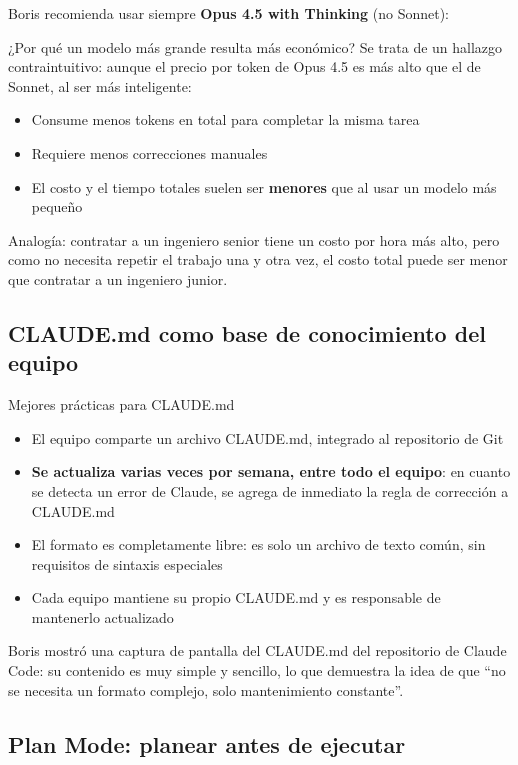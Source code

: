 \documentclass[a4paper]{article}
\begin{document}
Boris recomienda usar siempre \textbf{Opus 4.5 with Thinking} (no Sonnet):

\begin{knowledgebox}{¿Por qué un modelo más grande resulta más económico?}
Se trata de un hallazgo contraintuitivo: aunque el precio por token de Opus 4.5 es más alto que el de Sonnet, al ser más inteligente:
\begin{itemize}
    \item Consume menos tokens en total para completar la misma tarea
    \item Requiere menos correcciones manuales
    \item El costo y el tiempo totales suelen ser \textbf{menores} que al usar un modelo más pequeño
\end{itemize}
Analogía: contratar a un ingeniero senior tiene un costo por hora más alto, pero como no necesita repetir el trabajo una y otra vez, el costo total puede ser menor que contratar a un ingeniero junior.
\end{knowledgebox}

\subsection{CLAUDE.md como base de conocimiento del equipo}

\begin{importantbox}{Mejores prácticas para CLAUDE.md}
\begin{itemize}
    \item El equipo comparte un archivo CLAUDE.md, integrado al repositorio de Git
    \item \textbf{Se actualiza varias veces por semana, entre todo el equipo}: en cuanto se detecta un error de Claude, se agrega de inmediato la regla de corrección a CLAUDE.md
    \item El formato es completamente libre: es solo un archivo de texto común, sin requisitos de sintaxis especiales
    \item Cada equipo mantiene su propio CLAUDE.md y es responsable de mantenerlo actualizado
\end{itemize}
\end{importantbox}

Boris mostró una captura de pantalla del CLAUDE.md del repositorio de Claude Code: su contenido es muy simple y sencillo, lo que demuestra la idea de que ``no se necesita un formato complejo, solo mantenimiento constante''.

\subsection{Plan Mode: planear antes de ejecutar}
\end{document}

